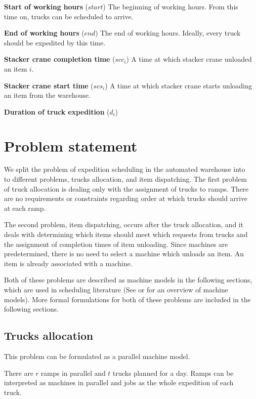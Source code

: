 \documentclass{ctuthesis}
\begin{document}
\noindent \textbf{Start of working hours} ($start$) The beginning of working hours. From this time on, trucks can be scheduled to arrive.

\noindent \textbf{End of working hours} ($end$) The end of working hours. Ideally, every truck should be expedited by this time.

\noindent \textbf{Stacker crane completion time} ($scc_i$) A time at which stacker crane unloaded an item $i$.

\noindent \textbf{Stacker crane start time} ($scs_i$) A time at which stacker crane starts unloading an item from the warehouse.

\noindent \textbf{Duration of truck expedition} ($d_i$)


\chapter{Problem statement}

 We split the problem of expedition scheduling in the automated warehouse into to different problems, trucks allocation, and item dispatching. The first problem of truck allocation is dealing only with the assignment of trucks to ramps. There are no requirements or constraints regarding order at which trucks should arrive at each ramp.
 
 The second problem, item dispatching, occurs after the truck allocation, and it deals with determining which items should meet which requests from trucks and the assignment of completion times of item unloading. Since machines are predetermined, there is no need to select a machine which unloads an item. An item is already associated with a machine.
 
Both of these problems are described as machine models in the following sections, which are used in scheduling literature (See \cite{pinedo} or \cite{brucker} for an overview of machine models). More formal formulations for both of these problems are included in the following sections.
 
 \section{Trucks allocation}
 \label{subsec:truckallocation}
This problem can be formulated as a parallel machine model.
 
 There are $r$ ramps in parallel and $t$ trucks planned for a day. Ramps can be interpreted as machines in parallel and jobs as the whole expedition of each truck. 
 
\end{document}
